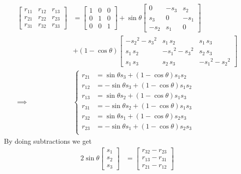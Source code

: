 \documentclass[a4paper]{scrartcl}
\begin{document}
\begin{equation}
    \begin{aligned}
        \begin{bmatrix}
            r_{11} & r_{12} & r_{13} \\  r_{21} & r_{22} & r_{23} \\  r_{31} & r_{32} & r_{33}
        \end{bmatrix} &= \begin{bmatrix}
            1 & 0& 0\\ 0&1 & 0 \\ 0& 0& 1
        \end{bmatrix} + 
        \sin\theta\begin{bmatrix}
            0 & -s_3 & s_2\\
        s_3 & 0 & -s_1\\
        -s_2 & s_1 & 0
        \end{bmatrix}\\ &+ 
        (1-\cos\theta) \begin{bmatrix}
             - {s_{2}}^2 - {s_{3}}^2 & s_{1}\, s_{2} & s_{1}\, s_{3}\\
             s_{1}\, s_{2} &  - {s_{1}}^2 - {s_{3}}^2 & s_{2}\, s_{3}\\
             s_{1}\, s_{3} & s_{2}\, s_{3} &  - {s_{1}}^2 - {s_{2}}^2
        \end{bmatrix} \\
        \implies &\begin{cases}
            r_{21} &= \sin\theta s_3 + (1-\cos\theta)s_1s_2\\
            r_{12} &= -\sin\theta s_3 + (1-\cos\theta)s_1s_2\\
            r_{13} &= \sin\theta s_2 + (1-\cos\theta)s_1s_3\\
            r_{31} &= -\sin\theta s_2 + (1-\cos\theta)s_1s_3\\
            r_{32} &= \sin\theta s_1 + (1-\cos\theta)s_2s_3\\
            r_{23} &= -\sin\theta s_1 + (1-\cos\theta)s_2s_3\\
        \end{cases}
    \end{aligned}
\end{equation}
By doing subtractions we get 
\begin{equation}
    \begin{aligned} 
        2\sin\theta\begin{bmatrix}
              s_1\\s_2\\s_3
        \end{bmatrix} &=
        \begin{bmatrix}
            r_{32} - r_{23}\\
            r_{13} - r_{31}\\
            r_{21} - r_{12}
        \end{bmatrix}
    \end{aligned}
\end{equation}
\end{document}
